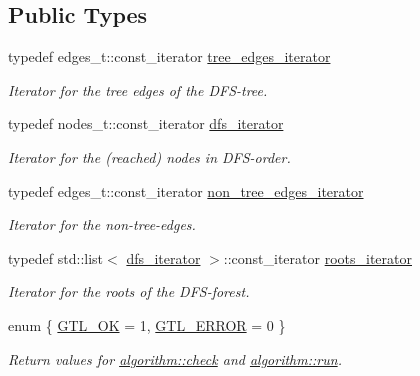 \subsection*{Public Types}
\begin{DoxyCompactItemize}
\item 
typedef edges\+\_\+t\+::const\+\_\+iterator \mbox{\hyperlink{classdfs_accde8d5403404f6d22fe4756d4ffedd5}{tree\+\_\+edges\+\_\+iterator}}
\begin{DoxyCompactList}\small\item\em Iterator for the tree edges of the D\+F\+S-\/tree. \end{DoxyCompactList}\item 
typedef nodes\+\_\+t\+::const\+\_\+iterator \mbox{\hyperlink{classdfs_a15fe023a5a1f7ddda00f3d87110d9a32}{dfs\+\_\+iterator}}
\begin{DoxyCompactList}\small\item\em Iterator for the (reached) nodes in D\+F\+S-\/order. \end{DoxyCompactList}\item 
typedef edges\+\_\+t\+::const\+\_\+iterator \mbox{\hyperlink{classdfs_a95e353f354d3b31daded0c4fe749171a}{non\+\_\+tree\+\_\+edges\+\_\+iterator}}
\begin{DoxyCompactList}\small\item\em Iterator for the non-\/tree-\/edges. \end{DoxyCompactList}\item 
typedef std\+::list$<$ \mbox{\hyperlink{classdfs_a15fe023a5a1f7ddda00f3d87110d9a32}{dfs\+\_\+iterator}} $>$\+::const\+\_\+iterator \mbox{\hyperlink{classdfs_a1ea6e8eb2766ac95ac48a8523359065a}{roots\+\_\+iterator}}
\begin{DoxyCompactList}\small\item\em Iterator for the roots of the D\+F\+S-\/forest. \end{DoxyCompactList}\item 
enum \{ \mbox{\hyperlink{classalgorithm_af1a0078e153aa99c24f9bdf0d97f6710a5114c20e4a96a76b5de9f28bf15e282b}{G\+T\+L\+\_\+\+OK}} = 1, 
\mbox{\hyperlink{classalgorithm_af1a0078e153aa99c24f9bdf0d97f6710a6fcf574690bbd6cf710837a169510dd7}{G\+T\+L\+\_\+\+E\+R\+R\+OR}} = 0
 \}
\begin{DoxyCompactList}\small\item\em Return values for \mbox{\hyperlink{classalgorithm_a76361fb03ad1cf643affc51821e43bed}{algorithm\+::check}} and \mbox{\hyperlink{classalgorithm_a734b189509a8d6b56b65f8ff772d43ca}{algorithm\+::run}}. \end{DoxyCompactList}\end{DoxyCompactItemize}
